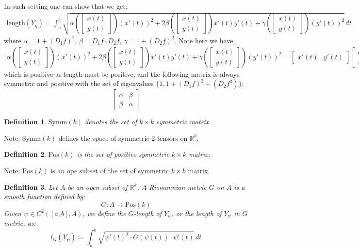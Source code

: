 \documentclass[11pt,oneside]{book}
\theoremstyle{break}
\theoremstyle{break}
\newtheorem{defn}{Definition}[corL]
\newcommand{\R}{\mathbb{R}}
\newcommand{\bmat}[1]{\begin{bmatrix} #1 \end{bmatrix}}
\newcommand{\note}{\color{red}Note: \color{black}}
\begin{document}
In such setting one can show that we get:
\begin{align*}
\text{length}\left(Y_{\eta}\right) = \int_a^b \sqrt{\alpha\left(\bmat{x\left(t\right)\\y\left(t\right)}\right)\left(x'\left(t\right)\right)^2 + 2\beta\left(\bmat{x\left(t\right) \\ y\left(t\right)}\right) x'\left(t\right) y'\left(t\right) + \gamma\left(\bmat{x\left(t\right) \\ y\left(t\right)}\right) \left(y'\left(t\right)\right)^2 }\, dt
\end{align*}
where $\alpha = 1+\left(D_1f\right)^2$, $\beta = D_1f \cdot D_2f$, $\gamma = 1+\left(D_2f\right)^2$. Note here we have:
\begin{align*}
\alpha\left(\bmat{x\left(t\right)\\y\left(t\right)}\right)\left(x'\left(t\right)\right)^2 + 2\beta\left(\bmat{x\left(t\right) \\ y\left(t\right)}\right) x'\left(t\right) y'\left(t\right) + \gamma\left(\bmat{x\left(t\right) \\ y\left(t\right)}\right) \left(y'\left(t\right)\right)^2  = \bmat{x'\left(t\right) & y'\left(t\right)}\bmat{\alpha &\beta \\ \beta & \alpha} \bmat{x'\left(t\right) \\ y'\left(t\right)}
\end{align*}
which is positive as length must be positive, and the following matrix is always symmetric and positive with the set of eigenvalues $\{1, 1+(D_1f)^2 + (D_2f^2)\}$:
$$\bmat{\alpha &\beta \\ \beta & \alpha}$$  

\begin{defn}
$\text{Symm}(k)$ denotes the set of $k\times k$ symmetric matrix. 
\end{defn}
\note $\text{Symm}(k)$ defines the space of symmetric $2$-tensors on $\R^k$. 

\begin{defn}
$\text{Pos}(k)$ is the set of positive symmetric $k\times k$ matrix.
\end{defn}
\note $\text{Pos}(k)$ is an ope subset of the set of symmetric $k\times k$ matrix.\\

\begin{defn}
Let $A$ be an open subset of $\R^k$. A Riemannian metric $G$ on $A$ is a smooth function defined by: 
$$G:A \to \text{Pos}(k)$$ 
Given $\psi\in C^2([a,b],A)$, we define the $G$-length of $Y_\psi$, or the length of $Y_{\psi}$ in $G$ metric, as: 
$$l_G(Y_{\psi}) \coloneqq \int_a^b \sqrt{\psi'(t)^T \cdot G(\psi(t))\cdot \psi'(t)}\, dt$$
\end{defn}
\end{document}
